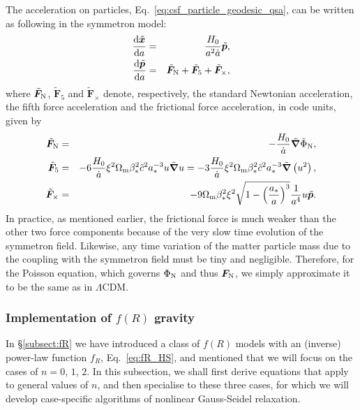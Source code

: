 The acceleration on particles, Eq.~\eqref{eq:csf_particle_geodesic_qsa}, can be written as following in the symmetron model:
\begin{eqnarray}
    \frac{{\rm d}\tilde{\boldsymbol{x}}}{{\rm d}a} &=& \frac{H_0}{a^2\dot{a}}{\tilde{\boldsymbol{p}}},\\
    \frac{{\rm d}\tilde{\boldsymbol{p}}}{{\rm d}a} &=& \tilde{\boldsymbol{F}}_{\rm N}+\tilde{\boldsymbol{F}}_5+\tilde{\boldsymbol{F}}_\times,
\end{eqnarray}
where $\tilde{\boldsymbol{F}}_{\rm N}$, $\tilde{\boldsymbol{F}}_5$ and $\tilde{\boldsymbol{F}}_\times$ denote, respectively, the standard Newtonian acceleration, the fifth force acceleration and the frictional force acceleration, in code units, given by
\begin{eqnarray}
    \label{eq:F_N_codeunit}\tilde{\boldsymbol{F}}_{\rm N} &=& -\frac{H_0}{\dot{a}}\tilde{\boldsymbol{\nabla}}\tilde{\Phi}_{\rm N},\\
    \label{eq:F_5_codeunit}\tilde{\boldsymbol{F}}_5 &=& -6\frac{H_0}{\dot{a}}\xi^2\Omega_{\rm m}\beta_\ast^2\tilde{c}^2a_{\ast}^{-3}u\tilde{\boldsymbol{\nabla}}u = -3\frac{H_0}{\dot{a}}\xi^2\Omega_{\rm m}\beta_\ast^2\tilde{c}^2a_{\ast}^{-3}\tilde{\boldsymbol{\nabla}}\left(u^2\right),\\
    \label{eq:F_x_codeunit}\tilde{\boldsymbol{F}}_\times &=& -9\Omega_{\rm m}\beta_\ast^2\xi^2\sqrt{1-\left(\frac{a_\ast}{a}\right)^3}\frac{1}{a^4}u\tilde{\boldsymbol{p}}.
\end{eqnarray}
In practice, as mentioned earlier, the frictional force is much weaker than the other two force components because of the very slow time evolution of the symmetron field. Likewise, any time variation of the matter particle mass due to the coupling with the symmetron field must be tiny and negligible. Therefore, for the Poisson equation, which governs $\Phi_{\rm N}$ and thus $\boldsymbol{F}_{\rm N}$, we simply approximate it to be the same as in $\Lambda$CDM.

\subsubsection{Implementation of $f(R)$ gravity}
\label{subsubsect:fR_imp}

In \S\ref{subsect:fR} we have introduced a class of $f(R)$ models with an (inverse) power-law function $f_R$, Eq.~\eqref{eq:fR_HS}, and mentioned that we will focus on the cases of $n=0$, $1$, $2$. In this subsection, we shall first derive equations that apply to general values of $n$, and then specialise to these three cases, for which we will develop case-specific algorithms of nonlinear Gauss-Seidel relaxation. 

